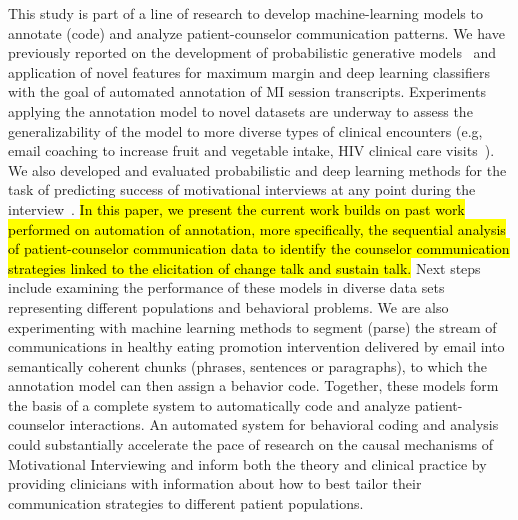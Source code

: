 This study is part of a line of research to develop machine-learning models to annotate (code) and analyze patient-counselor communication patterns. We have previously reported on the development of probabilistic generative models~\cite{kotov2014towards, kotov2015interpretable} and application of novel features for maximum margin and deep learning classifiers~\cite{hasan2016study} with the goal of automated annotation of MI session transcripts. Experiments applying the annotation model to novel datasets are underway to assess the generalizability of the model to more diverse types of clinical encounters (e.g, email coaching to increase fruit and vegetable intake, HIV clinical care visits~\cite{carcone2018using}). We also developed and evaluated probabilistic and deep learning methods for the task of predicting success of motivational interviews at any point during the interview~\cite{hasan2018predicting}. \hl{In this paper, we present the current work builds on past work performed on automation of annotation, more specifically, the sequential analysis of patient-counselor communication data to identify the counselor communication strategies linked to the elicitation of change talk and sustain talk.} Next steps include examining the performance of these models in diverse data sets representing different populations and behavioral problems. We are also experimenting with machine learning methods to segment (parse) the stream of communications in healthy eating promotion intervention delivered by email into semantically coherent chunks (phrases, sentences or paragraphs), to which the annotation model can then assign a behavior code. Together, these models form the basis of a complete system to automatically code and analyze patient-counselor interactions. An automated system for behavioral coding and analysis could substantially accelerate the pace of research on the causal mechanisms of Motivational Interviewing and inform both the theory and clinical practice by providing clinicians with information about how to best tailor their communication strategies to different patient populations. 

